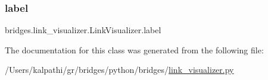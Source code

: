 \subsubsection{\texorpdfstring{label}{label}}
{\footnotesize\ttfamily bridges.\+link\+\_\+visualizer.\+Link\+Visualizer.\+label}



The documentation for this class was generated from the following file\+:\begin{DoxyCompactItemize}
\item 
/\+Users/kalpathi/gr/bridges/python/bridges/\mbox{\hyperlink{link__visualizer_8py}{link\+\_\+visualizer.\+py}}\end{DoxyCompactItemize}
